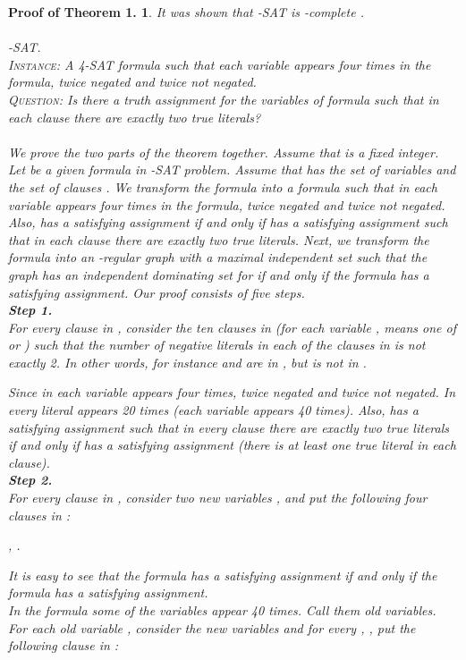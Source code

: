 \documentclass[
final
]{dmtcs-episciences}
\newtheorem{preali}{{\bf Proof of Theorem 1.}}
\newenvironment{ali}[1]{\begin{preali}{\rm
			#1}\hfill{}}{\end{preali}}
\begin{document}
\begin{ali}{
		It was shown that -SAT is -complete \cite{Puzzle}. 
\\ \\
{\em -SAT.}\\
\textsc{Instance}: A 4-SAT formula  such that  each variable appears four
times in the formula, twice negated and twice not negated.\\
\textsc{Question}: Is there a truth assignment for the variables  of formula   such that in each clause there are exactly two true
literals?
\\ \\		
We prove the two parts of the theorem together.
		Assume that  is a fixed integer. Let  be a given formula in -SAT problem. Assume that  has  the set of variables  and the set of clauses .
		We transform the formula  into a
		formula   such that in 
		each variable appears four
		times in the formula, twice negated and twice not negated. Also,
		 has a  satisfying assignment  if and only if  has a  satisfying assignment such that in each clause there are exactly two true literals. Next, we transform the formula  into  an  -regular  graph  with a maximal independent set 
		such that the graph  has an independent dominating set  for  if and only if the formula  has a  satisfying assignment.
		Our proof consists of five steps.\\
		{{\bf Step 1.}}\\
		For every clause  in , consider the ten clauses  in  (for each variable ,  means one of  or ) such that the number of negative literals in each of the clauses in  is not exactly 2.
		In other words, for instance  and  are in , but  is not in .
		
		Since in  each variable appears four
		times, twice negated and twice not negated. In  every literal appears 20 times (each variable appears 40 times). Also,  has a  satisfying assignment such that in every clause there are exactly two true literals if and only if  has a satisfying assignment (there is at least one true literal in each clause).\\
		{{\bf Step 2.}}\\
		For every clause  in , consider two new variables ,  and put the following four clauses in :
		
		\begin{center}
			, .
		\end{center}
		
		It is easy to see that the formula  has a  satisfying assignment if and only if the formula  has a  satisfying assignment.\\
		In the formula  some of the variables appear 40
		times. Call them old  variables. For each old variable , consider the new variables  and for every , , put the following clause in :
		
}
\end{ali}
\end{document}
